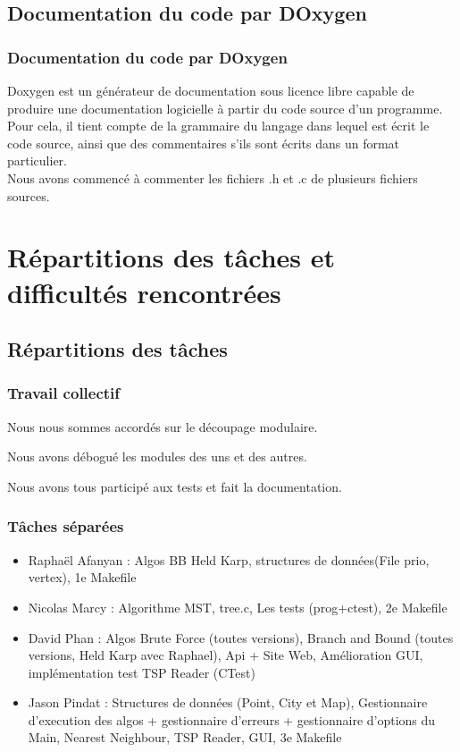 \documentclass[12pt]{report}
\begin{document}
{{{{{{{\subsection{Documentation du code par DOxygen}

\subsubsection{Documentation du code par DOxygen}

Doxygen est un générateur de documentation sous licence libre capable de produire une documentation logicielle à partir du code source d'un programme. Pour cela, il tient compte de la grammaire du langage dans lequel est écrit le code source, ainsi que des commentaires s'ils sont écrits dans un format particulier. \\
Nous avons commencé à commenter les fichiers .h et .c de plusieurs fichiers sources. 



\section{Répartitions des tâches et difficultés rencontrées}

\subsection{Répartitions des tâches}

\subsubsection{Travail collectif}

Nous nous sommes accordés sur le découpage modulaire.

Nous avons débogué les modules des uns et des autres.

Nous avons tous participé aux tests et fait la documentation.

\subsubsection{Tâches séparées}

\begin{itemize}
\item Raphaël Afanyan : Algos BB Held Karp, structures de données(File prio, vertex), 1e Makefile
\item Nicolas Marcy : Algorithme MST, tree.c, Les tests (prog+ctest), 2e Makefile
\item David Phan : Algos Brute Force (toutes versions), Branch and Bound (toutes versions, Held Karp avec Raphael), Api + Site Web, Amélioration GUI, implémentation test TSP Reader (CTest)
\item Jason Pindat : Structures de données (Point, City et Map), Gestionnaire d'execution des algos + gestionnaire d'erreurs + gestionnaire d'options du Main, Nearest Neighbour, TSP Reader, GUI, 3e Makefile
\end{itemize}


}}}}}}}
\end{document}
